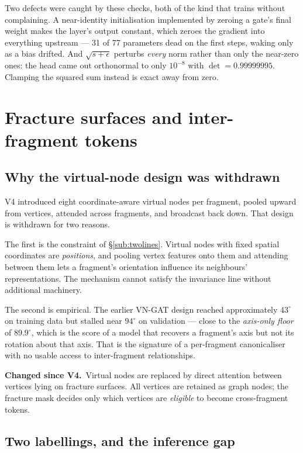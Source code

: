\documentclass[11pt,a4paper]{report}
\newcommand{\change}[1]{\par\vspace{2pt}\noindent\textcolor{soft}{\small\textbf{Changed since V4.}\ #1}\par\vspace{2pt}}
\begin{document}
Two defects were caught by these checks, both of the kind that trains without
complaining. A near-identity initialisation implemented by zeroing a gate's
final weight makes the layer's output constant, which zeroes the gradient into
everything upstream --- 31 of 77 parameters dead on the first steps, waking only
as a bias drifted. And $\sqrt{s + \epsilon}$ perturbs \emph{every} norm rather
than only the near-zero ones: the head came out orthonormal to only $10^{-8}$
with $\det = 0.99999995$. Clamping the squared sum instead is exact away from
zero.

\section{Fracture surfaces and inter-fragment tokens}
\label{sec:tokens}

\subsection{Why the virtual-node design was withdrawn}
\label{sub:virtual}

V4 introduced eight coordinate-aware virtual nodes per fragment, pooled upward
from vertices, attended across fragments, and broadcast back down. That design
is withdrawn for two reasons.

The first is the constraint of \S\ref{sub:twolines}. Virtual nodes with fixed spatial
coordinates are \emph{positions}, and pooling vertex features onto them and
attending between them lets a fragment's orientation influence its neighbours'
representations. The mechanism cannot satisfy the invariance line without
additional machinery.

The second is empirical. The earlier VN-GAT design reached approximately
$43^{\circ}$ on training data but stalled near $94^{\circ}$ on validation --- close
to the \emph{axis-only floor} of $89.9^{\circ}$, which is the score of a model
that recovers a fragment's axis but not its rotation about that axis. That is
the signature of a per-fragment canonicaliser with no usable access to
inter-fragment relationships.

\change{Virtual nodes are replaced by direct attention between vertices lying on
fracture surfaces. All vertices are retained as graph nodes; the fracture mask
decides only which vertices are \emph{eligible} to become cross-fragment
tokens.}

\subsection{Two labellings, and the inference gap}
\label{sub:labellings}
\end{document}
